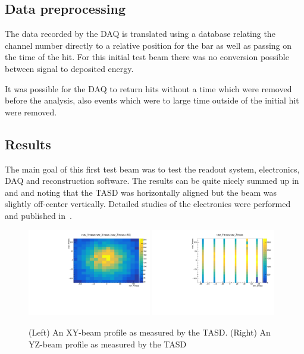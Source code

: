 
\subsection{Data preprocessing}

The data recorded by the DAQ is translated using a database relating the channel number directly to a relative position for the bar as well as passing on the time of the hit. For this initial test beam there was no conversion possible between signal to deposited energy.

It was possible for the DAQ to return hits without a time which were removed before the analysis, also events which were to large time outside of the initial hit were removed.

\subsection{Results}

The main goal of this first test beam was to test the readout system, electronics, DAQ and reconstruction software. The results can be quite nicely summed up in  and  and noting that the TASD was horizontally aligned but the beam was slightly off-center vertically. Detailed studies of the electronics were performed and published in~\cite{52Georgi}.


\begin{figure}[h!]
\centering
\includegraphics[width=0.48\textwidth]{figures/nuphys/newFigures/beamXYplane1Hadron.pdf}
\includegraphics[width=0.48\textwidth]{figures/nuphys/newFigures/beamYZhadron.pdf}
\caption{(Left) An XY-beam profile as measured by the TASD. (Right) An YZ-beam profile as measured by the TASD}
\label{fig:TASDres2}
\end{figure}


